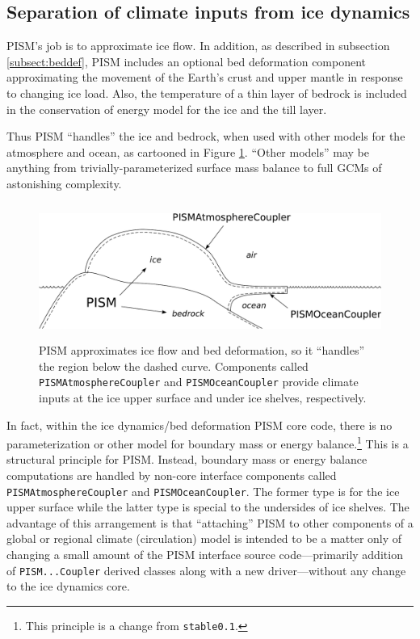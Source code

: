 \documentclass[11pt,final]{amsart}
\renewcommand{\t}[1]{\texttt{#1}}
\begin{document}
\subsection{Separation of climate inputs from ice dynamics}\label{subsect:separateclimate}  
PISM's job is to approximate ice flow.  In addition, as described in subsection \ref{subsect:beddef}, PISM includes an optional bed deformation component approximating the movement of the Earth's crust and upper mantle in response to changing ice load.  Also, the temperature of a thin layer of bedrock is included in the conservation of energy model for the ice and the till layer.

Thus PISM ``handles'' the ice and bedrock, when used with other models for the atmosphere and ocean, as cartooned in Figure \ref{fig:climatecartoon}.  ``Other models'' may be anything from trivially-parameterized surface mass balance to full GCMs of astonishing complexity.

\begin{figure}[ht]
\vspace{0.2in}
\includegraphics[height=1.75in,keepaspectratio=true]{figs/climate_cartoon}

\vspace{0.1in}
\caption{PISM approximates ice flow and bed deformation, so it ``handles'' the region below the dashed curve.  Components called \t{PISMAtmosphereCoupler} and \t{PISMOceanCoupler} provide climate inputs at the ice upper surface and under ice shelves, respectively.}
\label{fig:climatecartoon}
\end{figure}

In fact, within the ice dynamics/bed deformation PISM core code, there is no parameterization or other model for boundary mass or energy balance.\footnote{This principle is a change from \t{stable0.1}.}  This is a structural principle for PISM.  Instead, boundary mass or energy balance computations are handled by non-core interface components called \t{PISMAtmosphereCoupler} and \t{PISMOceanCoupler}.   The former type is for the ice upper surface while the latter type is special to the undersides of ice shelves.  The advantage of this arrangement is that ``attaching'' PISM to other components of a global or regional climate (circulation) model is intended to be a matter only of changing a small amount of the PISM interface source code---primarily addition of \t{PISM...Coupler} derived classes along with a new driver---without any change to the ice dynamics core.
\end{document}
